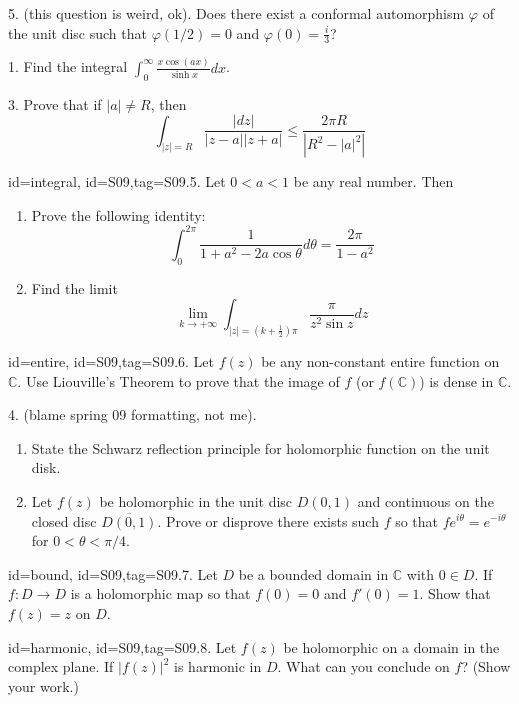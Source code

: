 \documentclass[12pt,letterpaper]{article}
\begin{document}
{5. (this question is weird, ok). Does there exist a conformal automorphism $\varphi$ of the unit disc such that $\varphi(1/2) = 0$ and $\varphi(0) = \frac{i}{3}$?

1. Find the integral $\int_{0}^{\infty} \frac{x \cos(ax)}{\sinh x} dx$.

3. Prove that if $| a | \ne R$, then
\[
	\int_{| z | = R} \frac{| dz |}{| z-a || z+a |} \le \frac{2 \pi R}{\left| R^2 - | a |^2 \right|}
\]



\item[id=integral, id=S09,tag=S09.5.]
Let $0 < a < 1$ be any real number. Then
\begin{enumerate}[label=(\alph*)]\onlyitems
\item Prove the following identity:
\[
	\int_{0}^{2\pi} \frac{1}{1 + a^2 - 2a \cos \theta} d\theta = \frac{2\pi}{1-a^2}
\]
\item Find the limit
\[
	\lim_{k\rightarrow+\infty} \int_{| z | = (k + \frac{1}{2})\pi} \frac{\pi}{z^2 \sin z} dz
\]
\end{enumerate}


\item[id=entire, id=S09,tag=S09.6.]
Let $f(z)$ be any non-constant entire function on $\mathbb{C}$. Use Liouville's Theorem to prove that the image of $f$ (or $f(\mathbb{C})$) is dense in $\mathbb{C}$.

4. (blame spring 09 formatting, not me).
\begin{enumerate}[label=(\alph*)]\onlyitems
\item State the Schwarz reflection principle for holomorphic function on the unit disk.
\item Let $f(z)$ be holomorphic in the unit disc $D(0,1)$ and continuous on the closed disc $\overline{D(0,1)}$. Prove or disprove there exists such $f$ so that $fe^{i\theta} = e^{-i\theta}$ for $0 < \theta < \pi/4$.
\end{enumerate}

\item[id=bound, id=S09,tag=S09.7.]
Let $D$ be a bounded domain in $\mathbb{C}$ with $0 \in D$. If $f : D \rightarrow D$ is a holomorphic map so that $f(0) = 0$ and $f'(0) = 1$. Show that $f(z) = z$ on $D$.

\item[id=harmonic, id=S09,tag=S09.8.]
Let $f(z)$ be holomorphic on a domain in the complex plane. If $| f(z) |^2$ is harmonic in $D$. What can you conclude on $f$? (Show your work.)

}
\end{document}
